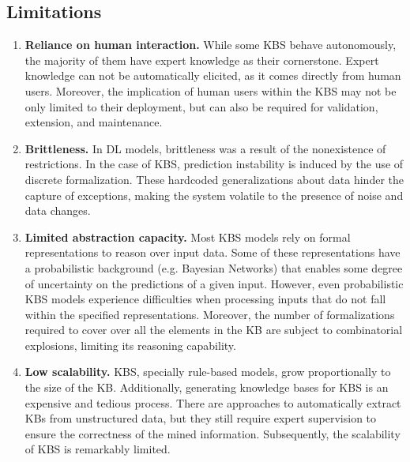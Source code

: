 \subsection*{Limitations}
\begin{enumerate} [start=1,label={\bfseries L\arabic*.}]
    \item \textbf{Reliance on human interaction.} \label{dl_intro_kbs_L_human} While some KBS behave autonomously, the majority of them have expert knowledge as their cornerstone.  Expert knowledge can not be automatically elicited, as it comes directly from human users. Moreover, the implication of human users within the KBS may not be only limited to their deployment, but can also be required for validation, extension, and maintenance. 
    \item \textbf{Brittleness.}\label{dl_into_kbs_L_brittle} In DL models, brittleness was a result of the nonexistence of restrictions. In the case of KBS, prediction instability is induced by the use of discrete formalization. These hardcoded generalizations about data hinder the capture of exceptions, making the system volatile to the presence of noise and data changes.  
    \item \textbf{Limited abstraction capacity.}\label{dl_into_kbs_L_abstraction} Most KBS models rely on formal representations to reason over input data. Some of these representations have a probabilistic background (e.g. Bayesian Networks) that enables some degree of uncertainty on the predictions of a given input. However, even probabilistic KBS models experience difficulties when processing inputs that do not fall within the specified representations. Moreover, the number of formalizations required to cover over all the elements in the KB are subject to combinatorial explosions, limiting its reasoning capability.
    \item \textbf{Low scalability.}\label{dl_into_kbs_L_scalability} KBS, specially rule-based models, grow proportionally to the size of the KB. Additionally, generating knowledge bases for KBS is an expensive and tedious process. There are approaches to automatically extract KBs from unstructured data, but they still require expert supervision to ensure the correctness of the mined information. Subsequently, the scalability of KBS is remarkably limited.  
\end{enumerate}

